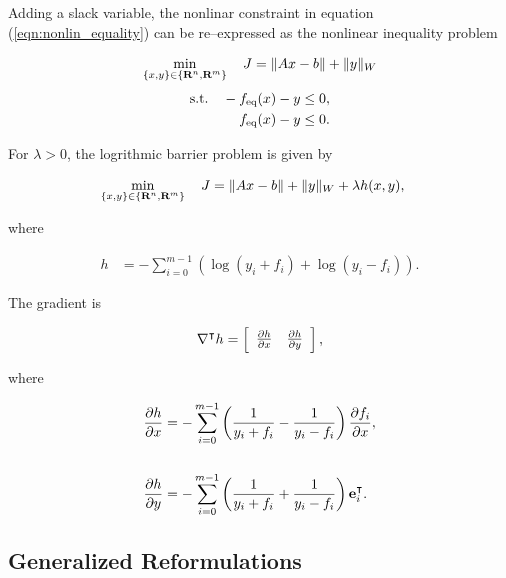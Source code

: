 \documentclass{article}
\begin{document}
    Adding a slack variable, the nonlinar constraint in equation (\ref{eqn:nonlin_equality}) can be re--expressed as the nonlinear inequality problem

    \begin{align}
        \min_{\{x,y\}\in\{\textbf{R}^n,\textbf{R}^m\}}\quad J = \|Ax-b\|+\|y\|_W
    \end{align}
    \begin{align*}
        \text{s.t.} \quad -f_{\text{eq}}(x)-y&\leq 0,\\
        f_{\text{eq}}(x)-y&\leq 0.
    \end{align*}


    For $\lambda>0$, the logrithmic barrier problem is given by \cite[p.~562]{bv_cvxbook}

    \begin{align*}
        \min_{\{x,y\}\in\{\textbf{R}^n,\textbf{R}^m\}}\quad J &= \|Ax-b\|+\|y\|_W+\lambda h(x,y),
    \end{align*}

    where 

    \begin{align*}
        h&=-\sum_{i=0}^{m-1}\left(\log(y_i+f_i)+\log(y_i-f_i)\right).
    \end{align*}

    The gradient is

    \begin{align*}
        \nabla^\intercal h=\left[\begin{array}{lllllllllllllllllll} \frac{\partial h}{\partial x} & \frac{\partial h}{\partial y}\end{array}\right], 
    \end{align*}

    where

    \begin{align*}
        \frac{\partial h}{\partial x}
            &=-\sum_{i=0}^{m-1} \left(\frac{1}{y_i+f_i}-\frac{1}{y_i-f_i}\right)\frac{\partial f_i}{\partial x}, \\\\
        \frac{\partial h}{\partial y}
            &=-\sum_{i=0}^{m-1} \left(\frac{1}{y_i+f_i}+\frac{1}{y_i-f_i}\right)\textbf{e}_i^\intercal.
    \end{align*}


\clearpage

\subsection{Generalized Reformulations}
\end{document}
